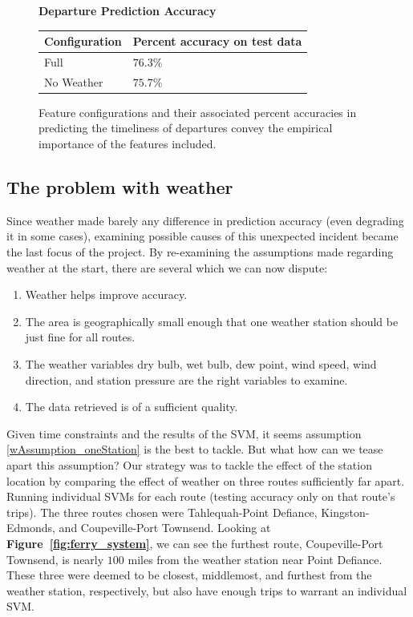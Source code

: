 \documentclass[11pt]{article} %
\begin{document}
\begin{figure}
    \centering
    \textbf{Departure Prediction Accuracy}

    \begin{tabular}{ll}
        Configuration & Percent accuracy on test data\\
        \hline
        Full        & $76.3\%$\\
        No Weather  & $75.7\%$\\
    \end{tabular}
    \caption{Feature configurations and their associated percent accuracies in
         predicting the timeliness of departures convey the empirical importance of 
         the features included.}
    \label{fig:second_run_data_departures}
\end{figure}

\subsection{The problem with weather}
\label{sec:weather_prob}
Since weather made barely any difference in prediction accuracy (even 
degrading it in some cases), examining possible causes of this unexpected 
incident became the last focus of the project. By re-examining the assumptions
made regarding weather at the start, there are several which we can now dispute:

\begin{enumerate}
    \item Weather helps improve accuracy.
    \item \label{wAssumption_oneStation} The area is geographically small enough 
        that one weather station should be just fine for all routes.
    \item The weather variables dry bulb, wet bulb, dew point, wind speed, 
        wind direction, and station pressure are the right variables to examine.
    \item The data retrieved is of a sufficient quality.
\end{enumerate}

Given time constraints and the results of the SVM, it seems assumption 
\ref{wAssumption_oneStation} is the best to tackle. But what how can we tease
apart this assumption? Our strategy was to tackle the effect of the station
location by comparing the effect of weather on three routes sufficiently far apart.
Running individual SVMs for each route (testing accuracy only on that route's 
trips). The three routes chosen were Tahlequah-Point Defiance, Kingston-Edmonds,
and Coupeville-Port Townsend. Looking at \textbf{Figure~\ref{fig:ferry_system}},
we can see the furthest route, Coupeville-Port Townsend, is nearly $100$ miles
from the weather station near Point Defiance. These three were deemed to be 
closest, middlemost, and furthest from the weather station, respectively, but also 
have enough trips to warrant an individual SVM. 
\end{document}
